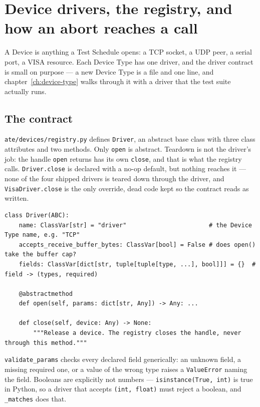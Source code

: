 \chapter{Device drivers, the registry, and how an abort reaches a call}\label{ch:devices}

A Device is anything a Test Schedule opens: a TCP socket, a UDP peer, a serial port, a VISA resource.
Each Device Type has one driver, and the driver contract is small on purpose --- a new Device Type is a
file and one line, and chapter~\ref{ch:device-type} walks through it with a driver that the test suite
actually runs.

\section{The contract}

\texttt{ate/\allowbreak{}devices/\allowbreak{}registry.py} defines \texttt{Driver}, an abstract base class with three class
attributes and two methods. Only \texttt{open} is abstract. Teardown is not the driver's job: the handle
\texttt{open} returns has its own \texttt{close}, and that is what the registry calls. \texttt{Driver.close}
is declared with a no-op default, but nothing reaches it --- none of the four shipped drivers is
teared down through the driver, and \texttt{VisaDriver.close} is the only override, dead code kept so the
contract reads as written.

\begin{lstlisting}[language=ATEPython]
class Driver(ABC):
    name: ClassVar[str] = "driver"                       # the Device Type name, e.g. "TCP"
    accepts_receive_buffer_bytes: ClassVar[bool] = False # does open() take the buffer cap?
    fields: ClassVar[dict[str, tuple[tuple[type, ...], bool]]] = {}  # field -> (types, required)

    @abstractmethod
    def open(self, params: dict[str, Any]) -> Any: ...

    def close(self, device: Any) -> None:
        """Release a device. The registry closes the handle, never through this method."""
\end{lstlisting}

\texttt{validate\_params} checks every declared field generically: an unknown field, a missing required
one, or a value of the wrong type raises a \texttt{ValueError} naming the field. Booleans are explicitly
not numbers --- \texttt{isinstance(True, int)} is true in Python, so a driver that accepts
\texttt{(int, float)} must reject a boolean, and \texttt{\_matches} does that.


